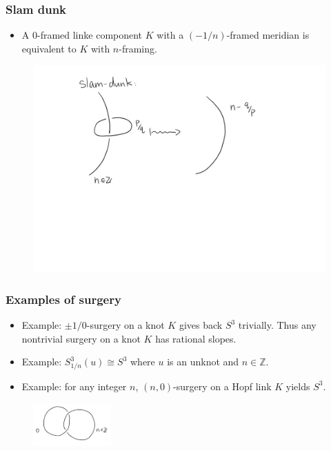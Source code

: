 \documentclass{beamer}
\theoremstyle{ex}
\theoremstyle{rem}
\begin{document}
	\begin{frame}
		\frametitle{Slam dunk}
		\begin{itemize}
			\item A $0$-framed linke component $K$ with a $(-1/n)$-framed meridian is equivalent to $K$ with $n$-framing.
		\end{itemize}
		\pause
		\begin{figure}
			\includegraphics[width=\textwidth]{slamdunk}
		\end{figure}
	\end{frame}

\begin{frame}
	\frametitle{Examples of surgery}
	\begin{itemize}
		\item Example: $\pm 1/0$-surgery on a knot $K$ gives back $S^3$ trivially. Thus any nontrivial surgery on a knot $K$ has rational slopes.  			
	\end{itemize}
	\begin{itemize}
		\item Example: $S^3_{1/n}(u) \cong S^3$ where $u$ is an unknot and $n \in \mathbb{Z}$.
			\item Example: for any integer $n$, $(n, 0)$-surgery on a Hopf link $K$ yields $S^3$.
	\end{itemize}
\begin{figure}
	\centering
	\includegraphics[width=30mm]{Hopf.jpg}
\end{figure}
		
\end{frame}
\end{document}

